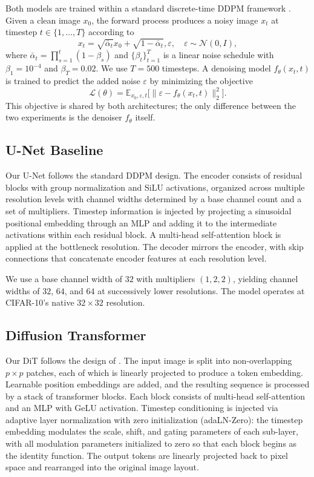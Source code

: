 \documentclass{article}
\begin{document}
Both models are trained within a standard discrete-time DDPM framework \citep{ho2020ddpm}. 
Given a clean image $x_0$, the forward process produces a noisy image $x_t$ at timestep $t\in\{1,\ldots,T\}$ according to 
\begin{equation}
    x_t=\sqrt{\bar\alpha_t}x_0+\sqrt{1-\bar\alpha_t},\varepsilon,\quad\varepsilon\sim\mathcal N(0,I),
    \label{eq:forward}
\end{equation}
where $\bar\alpha_t = \prod_{s=1}^{t}(1-\beta_s)$ and $\{\beta_t\}_{t=1}^T$ is a linear noise schedule with $\beta_1=10^{-4}$ and $\beta_T=0.02$.
We use $T=500$ timesteps.
A denoising model $f_\theta(x_t,t)$ is trained to predict the added noise $\varepsilon$ by minimizing the objective
\begin{equation}
    \mathcal{L}(\theta)=\mathbb E_{x_0, \varepsilon, t}\bigl[\lVert\varepsilon-f_\theta(x_t,t)\rVert_2^2\bigr].
    \label{eq:loss}
\end{equation}
This objective is shared by both architectures; the only difference between the two experiments is the denoiser $f_\theta$ itself.

\subsection{U-Net Baseline}
Our U-Net follows the standard DDPM design. 
The encoder consists of residual blocks with group normalization and SiLU activations, organized across multiple resolution levels with channel widths determined by a base channel count and a set of multipliers.
Timestep information is injected by projecting a sinusoidal positional embedding through an MLP and adding it to the intermediate activations within each residual block.
A multi-head self-attention block is applied at the bottleneck resolution.
The decoder mirrors the encoder, with skip connections that concatenate encoder features at each resolution level.

We use a base channel width of $32$ with multipliers $(1,2,2)$, yielding channel widths of $32$, $64$, and $64$ at successively lower resolutions. 
The model operates at CIFAR-10's native $32 \times 32$ resolution.

\subsection{Diffusion Transformer}

Our DiT follows the design of \citep{peebles2023dit}.
The input image is split into non-overlapping $p\times p$ patches, each of which is linearly projected to produce a token embedding.
Learnable position embeddings are added, and the resulting sequence is processed by a stack of transformer blocks.
Each block consists of multi-head self-attention and an MLP with GeLU activation.
Timestep conditioning is injected via adaptive layer normalization with zero initialization (adaLN-Zero): the timestep embedding modulates the scale, shift, and gating parameters of each sub-layer, with all modulation parameters initialized to zero so that each block begins as the identity function.
The output tokens are linearly projected back to pixel space and rearranged into the original image layout.
\end{document}
